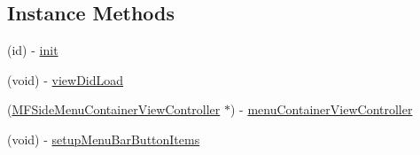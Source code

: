 \subsection*{Instance Methods}
\begin{DoxyCompactItemize}
\item 
(id) -\/ \hyperlink{interface_view_controller_a4213bb26f5207ee3f402fe463badc691}{init}
\item 
(void) -\/ \hyperlink{interface_view_controller_aa5a50adbd2b567d3a8ae3445329b70d1}{view\-Did\-Load}
\item 
(\hyperlink{interface_m_f_side_menu_container_view_controller}{M\-F\-Side\-Menu\-Container\-View\-Controller} $\ast$) -\/ \hyperlink{interface_view_controller_ad9f497773e1c2f5e420929a60f3bf7df}{menu\-Container\-View\-Controller}
\item 
\hypertarget{interface_view_controller_a9644bcb73520daa217ad0709b0e6bd64}{(void) -\/ \hyperlink{interface_view_controller_a9644bcb73520daa217ad0709b0e6bd64}{setup\-Menu\-Bar\-Button\-Items}}\label{interface_view_controller_a9644bcb73520daa217ad0709b0e6bd64}


\end{DoxyCompactItemize}
